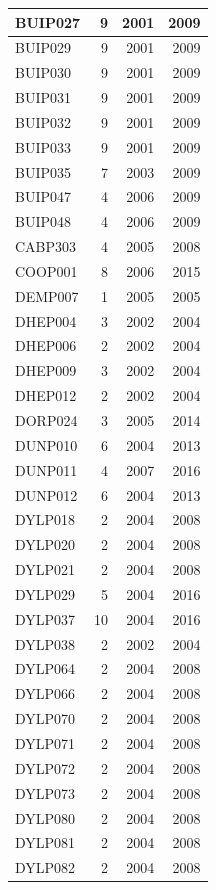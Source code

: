 \documentclass[11pt,]{book}
\begin{document}
\begin{table}
\begin{tabular}[t]{l|r|r|r}
\hline
BUIP027 & 9 & 2001 & 2009\\
\hline
BUIP029 & 9 & 2001 & 2009\\
\hline
BUIP030 & 9 & 2001 & 2009\\
\hline
BUIP031 & 9 & 2001 & 2009\\
\hline
BUIP032 & 9 & 2001 & 2009\\
\hline
BUIP033 & 9 & 2001 & 2009\\
\hline
BUIP035 & 7 & 2003 & 2009\\
\hline
BUIP047 & 4 & 2006 & 2009\\
\hline
BUIP048 & 4 & 2006 & 2009\\
\hline
CABP303 & 4 & 2005 & 2008\\
\hline
COOP001 & 8 & 2006 & 2015\\
\hline
DEMP007 & 1 & 2005 & 2005\\
\hline
DHEP004 & 3 & 2002 & 2004\\
\hline
DHEP006 & 2 & 2002 & 2004\\
\hline
DHEP009 & 3 & 2002 & 2004\\
\hline
DHEP012 & 2 & 2002 & 2004\\
\hline
DORP024 & 3 & 2005 & 2014\\
\hline
DUNP010 & 6 & 2004 & 2013\\
\hline
DUNP011 & 4 & 2007 & 2016\\
\hline
DUNP012 & 6 & 2004 & 2013\\
\hline
DYLP018 & 2 & 2004 & 2008\\
\hline
DYLP020 & 2 & 2004 & 2008\\
\hline
DYLP021 & 2 & 2004 & 2008\\
\hline
DYLP029 & 5 & 2004 & 2016\\
\hline
DYLP037 & 10 & 2004 & 2016\\
\hline
DYLP038 & 2 & 2002 & 2004\\
\hline
DYLP064 & 2 & 2004 & 2008\\
\hline
DYLP066 & 2 & 2004 & 2008\\
\hline
DYLP070 & 2 & 2004 & 2008\\
\hline
DYLP071 & 2 & 2004 & 2008\\
\hline
DYLP072 & 2 & 2004 & 2008\\
\hline
DYLP073 & 2 & 2004 & 2008\\
\hline
DYLP080 & 2 & 2004 & 2008\\
\hline
DYLP081 & 2 & 2004 & 2008\\
\hline
DYLP082 & 2 & 2004 & 2008\\

\end{tabular}
\end{table}
\end{document}
